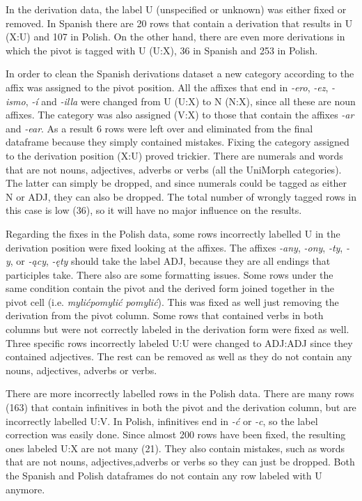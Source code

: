 \documentclass[12pt]{article}
\begin{document}
In the derivation data, the label U (unspecified or unknown) was either fixed or removed. In Spanish there are 20 rows that contain a derivation that results in U (X:U) and 107 in Polish. On the other hand, there are even more derivations in which the pivot is tagged with U (U:X), 36 in Spanish and 253 in Polish.

In order to clean the Spanish derivations dataset a new category according to the affix was assigned to the pivot position. All the affixes that end in \textit{-ero}, \textit{-ez}, \textit{-ismo}, \textit{-í} and \textit{-illa} were changed from U (U:X) to N (N:X), since all these are noun affixes. The category was also assigned (V:X) to those that contain the affixes \textit{-ar} and \textit{-ear}. As a result 6 rows were left over and eliminated from the final dataframe because they simply contained mistakes. Fixing the category assigned to the derivation position (X:U) proved trickier. There are numerals and words that are not nouns, adjectives, adverbs or verbs (all the UniMorph categories). The latter can simply be dropped, and since numerals could be tagged as either N or ADJ, they can also be dropped. The total number of wrongly tagged rows in this case is low (36), so it will have no major influence on the results.

Regarding the fixes in the Polish data, some rows incorrectly labelled U in the derivation position were fixed looking at the affixes. The affixes \textit{-any}, \textit{-ony}, \textit{-ty}, \textit{-y}, or \textit{-ący}, \textit{-ęty} should take the label ADJ, because they are all endings that participles take. There also are some formatting issues. Some rows under the same condition contain the pivot and the derived form joined together in the pivot cell (i.e. \textit{mylićpomylić pomylić}). This was fixed as well just removing the derivation from the pivot column. Some rows that contained verbs in both columns but were not correctly labeled in the derivation form were fixed as well. Three specific rows incorrectly labeled U:U were changed to ADJ:ADJ since they contained adjectives. The rest can be removed as well as they do not contain any nouns, adjectives, adverbs or verbs.

There are more incorrectly labelled rows in the Polish data. There are many rows (163) that contain infinitives in both the pivot and the derivation column, but are incorrectly labelled U:V. In Polish, infinitives end in \textit{-ć} or \textit{-c}, so the label correction was easily done. Since almost 200 rows have been fixed, the resulting ones labeled U:X are not many (21). They also contain mistakes, such as words that are not nouns, adjectives,adverbs or verbs so they can just be dropped. Both the Spanish and Polish dataframes do not contain any row labeled with U anymore.
\end{document}
